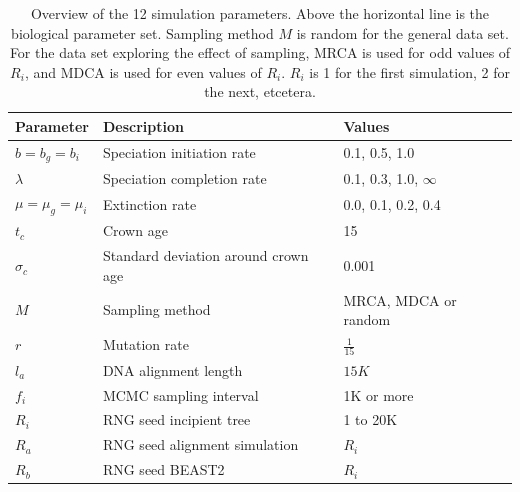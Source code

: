 \documentclass{article}
\begin{document}
\begin{table}
  \centering 
  \begin{tabular}{l l l}
    \hline
    Parameter             & Description & Values \\
    \hline
    \hline
    $b = b_g = b_i$       & Speciation initiation rate & 0.1, 0.5, 1.0 \\
    $\lambda$             & Speciation completion rate & 0.1, 0.3, 1.0, $\infty$ \\
    $\mu = \mu_g = \mu_i$ & Extinction rate & 0.0, 0.1, 0.2, 0.4 \\
    \hline
    $t_c$                 & Crown age & 15 \\
    $\sigma_c$            & Standard deviation around crown age & 0.001 \\
    $M$                   & Sampling method & MRCA, MDCA or random \\
    $r$                   & Mutation rate & $\frac{1}{15}$ \\
    $l_a$                 & DNA alignment length & $15K$ \\
    $f_i$                 & MCMC sampling interval & 1K or more \\
    $R_i$                 & RNG seed incipient tree & 1 to 20K \\
    $R_a$                 & RNG seed alignment simulation & $R_i$ \\
    $R_b$                 & RNG seed BEAST2 & $R_i$ \\
    \hline
  \end{tabular}
  \caption{
    Overview of the 12 simulation parameters. Above the horizontal line is 
    the biological parameter set. Sampling method $M$ is random for the general
    data set. For the data set exploring the effect of sampling, MRCA is
    used for odd values of $R_i$, and MDCA is used for even values of $R_i$.
    $R_i$ is 1 for the first simulation, 2 for the next, etcetera.
  }
  \label{table:parameters}
\end{table}
\end{document}
